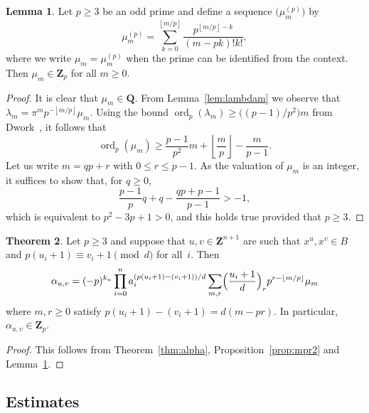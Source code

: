 \documentclass[a4paper,11pt]{article}
\numberwithin{equation}{section}
\providecommand{\floor}[1]{\left\lfloor#1\right\rfloor}   %
\newcommand{\ZZ}{\mathbf{Z}} %
\newcommand{\QQ}{\mathbf{Q}} %
\DeclareMathOperator{\ord}{ord}          %
\theoremstyle{definition}
\newtheorem{thm}{Theorem}[section]
\newtheorem{lem}[thm]{Lemma}
\begin{document}
\begin{lem} \label{lem:mup}
Let $p \geq 3$ be an odd prime and define a sequence 
$\bigl(\mu_m^{(p)}\bigr)$ by 
\begin{equation*}
\mu_m^{(p)} = \sum_{k=0}^{\floor{m/p}} \frac{p^{\floor{m/p} - k}}{(m-pk)! k!}, 
\end{equation*}
where we write $\mu_m = \mu_m^{(p)}$ when the prime can be identified 
from the context.  Then $\mu_m \in \ZZ_p$ for all $m \geq 0$.
\end{lem}

\begin{proof}
It is clear that $\mu_m \in \QQ$.  From Lemma~\ref{lem:lambdam} 
we observe that $\lambda_m = \pi^m p^{- \floor{m/p}} \mu_m$.  Using the 
bound $\ord_p(\lambda_m) \geq \bigl((p-1)/p^2\bigr) m$ 
from Dwork~\citep[pp.~55--57]{Dwork1962}, it follows that 
\begin{equation*}
\ord_p (\mu_m) \geq \frac{p-1}{p^2} m + \floor{\frac{m}{p}} - \frac{m}{p-1}.
\end{equation*}
Let us write $m = q p + r$ with $0 \leq r \leq p-1$.  As the valuation 
of $\mu_m$ is an integer, it suffices to show that, for $q \geq 0$, 
\begin{equation*}
\frac{p-1}{p} q + q - \frac{q p + p - 1}{p - 1} > -1,
\end{equation*}
which is equivalent to $p^2 - 3p + 1 > 0$, and this holds true 
provided that $p \geq 3$.
\end{proof}

\begin{thm} \label{thm:alphap}
Let $p \geq 3$ and suppose that $u, v \in \ZZ^{n+1}$ are such 
that $x^u, x^v \in B$ and 
$p (u_i + 1) \equiv v_i + 1 \pmod{d}$ for all~$i$. Then 
\begin{equation*}
\alpha_{u,v} = (-p)^{k_u} \prod_{i=0}^n 
    a_i^{(p (u_i + 1) - (v_i + 1))/d} \sum_{m,r} 
    \Bigl(\frac{u_i+1}{d}\Bigr)_r p^{r - \floor{m/p}} \mu_m
\end{equation*}
where $m, r \geq 0$ satisfy $p (u_i + 1) - (v_i + 1) = d (m - pr)$. 
In particular, $\alpha_{u, v} \in \ZZ_p$. 
\end{thm}

\begin{proof}
This follows from Theorem~\ref{thm:alpha}, Proposition~\ref{prop:mpr2} 
and Lemma~\ref{lem:mup}.
\end{proof}

\subsection{Estimates}
\end{document}
